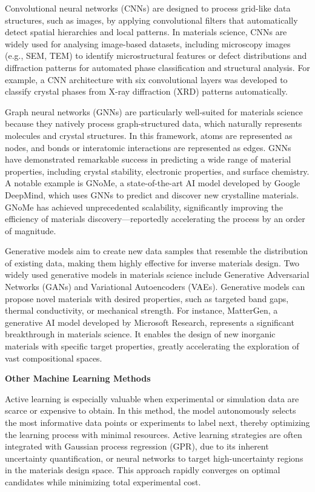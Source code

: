 Convolutional neural networks (CNNs) are designed to process grid-like data structures, such as images, by applying convolutional filters that automatically detect spatial hierarchies and local patterns. In materials science, CNNs are widely used for analysing image-based datasets, including microscopy images (e.g., SEM, TEM) to identify microstructural features or defect distributions and diffraction patterns for automated phase classification and structural analysis\cite{RN550,RN604,RN564}. For example, a CNN architecture with six convolutional layers was developed to classify crystal phases from X-ray diffraction (XRD) patterns automatically\cite{RN604}.

Graph neural networks (GNNs) are particularly well-suited for materials science because they natively process graph-structured data, which naturally represents molecules and crystal structures. In this framework, atoms are represented as nodes, and bonds or interatomic interactions are represented as edges. GNNs have demonstrated remarkable success in predicting a wide range of material properties, including crystal stability, electronic properties, and surface chemistry\cite{RN336,RN562,RN362}. A notable example is GNoMe, a state-of-the-art AI model developed by Google DeepMind, which uses GNNs to predict and discover new crystalline materials. GNoMe has achieved unprecedented scalability, significantly improving the efficiency of materials discovery—reportedly accelerating the process by an order of magnitude\cite{RN601}.

Generative models aim to create new data samples that resemble the distribution of existing data, making them highly effective for inverse materials design. Two widely used generative models in materials science include Generative Adversarial Networks (GANs) and Variational Autoencoders (VAEs). Generative models can propose novel materials with desired properties, such as targeted band gaps, thermal conductivity, or mechanical strength\cite{RN326,RN532,RN412}. For instance, MatterGen, a generative AI model developed by Microsoft Research, represents a significant breakthrough in materials science\cite{RN633}. It enables the design of new inorganic materials with specific target properties, greatly accelerating the exploration of vast compositional spaces.

\textbf{Other Machine Learning Methods}

Active learning is especially valuable when experimental or simulation data are scarce or expensive to obtain. In this method, the model autonomously selects the most informative data points or experiments to label next, thereby optimizing the learning process with minimal resources. Active learning strategies are often integrated with Gaussian process regression (GPR), due to its inherent uncertainty quantification, or neural networks to target high-uncertainty regions in the materials design space. This approach rapidly converges on optimal candidates while minimizing total experimental cost\cite{RN601, RN604, RN551,RN532}.

